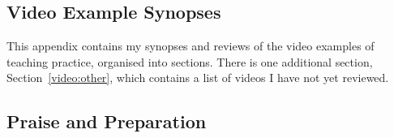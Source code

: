 \documentclass[12pt]{report}
\begin{document}
\begin{appendices}

\chapter{Video Example Synopses}
\label{app:videos}

This appendix contains my synopses and reviews of the video examples of teaching practice, organised into sections. There is one additional section, Section~\ref{video:other}, which contains a list of videos I have not yet reviewed.

\section{Praise and Preparation}
\label{video:1}


\end{appendices}
\end{document}
